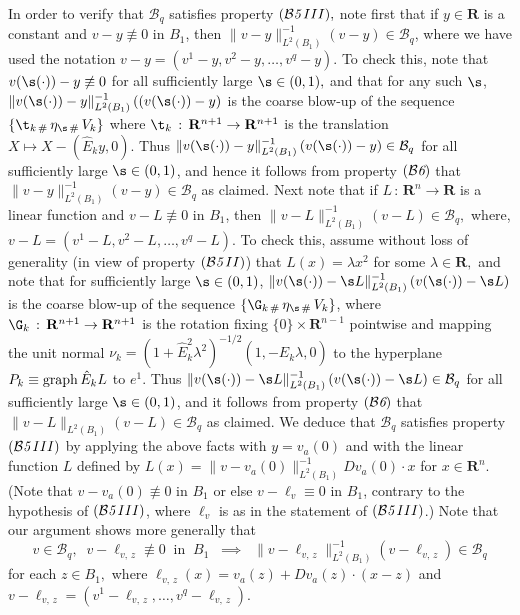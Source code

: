 \documentclass[a4paper,11pt]{amsart}
\begin{document}
In order to verify that ${\mathcal B}_{q}$ satisfies property $({\mathcal B{\emph 5 \, III}}),$ note first that if $y \in {\mathbf R}$ is a constant and $v - y \not\equiv 0$ in $B_{1}$, then $\|v - y\|_{L^{2}(B_{1})}^{-1}(v-y)\in {\mathcal B}_{q}$,  where we have used the notation $v - y = (v^{1} - y, v^{2} - y, \ldots, v^{q} - y).$ To check this, note that $v(\s(\cdot)) - y \not\equiv 0$ for 
all sufficiently large $\s \in (0, 1),$ and  that for any such $\s$, $\|v(\s(\cdot)) - y\|_{L^{2}(B_{1})}^{-1}\left((v(\s(\cdot)) - y\right)$ is the coarse blow-up of the sequence $\{\t_{k \, \#} \, \eta_{\s \, \#} \, V_{k}\}$ where $\t_{k} \, : \, {\mathbf R}^{n+1} \to {\mathbf R}^{n+1}$ is the translation $X \mapsto X - ({\hat E}_{k}y, 0).$ Thus $\|v(\s(\cdot)) - y\|_{L^{2}(B_{1})}^{-1}\left(v(\s(\cdot)) - y\right)\in {\mathcal B}_{q}$ for all sufficiently large $\s \in (0, 1)$, and hence it follows from property $({\mathcal B{\emph 6}})$ that $\|v - y\|_{L^{2}(B_{1})}^{-1}(v-y) \in {\mathcal B}_{q}$ as claimed. Next note that if $L \, : \, {\mathbf R}^{n} \to {\mathbf R}$ is a linear function and 
$v - L \not\equiv 0$ in $B_{1}$, then $\|v - L\|_{L^{2}(B_{1})}^{-1}(v-L) \in {\mathcal B}_{q},$ where, $v - L = (v^{1} - L, v^{2} - L, \ldots, v^{q} - L).$ To check this, assume without loss of generality (in view of property $({\mathcal B{\emph 5 \, II}})$) that $L(x) = \lambda x^{2}$ for some $\lambda \in {\mathbf R},$ and note that for sufficiently large $\s \in (0, 1)$, 
$\|v(\s(\cdot)) - \s L\|_{L^{2}(B_{1})}^{-1}\left(v(\s(\cdot)) - \s L\right)$ is the coarse blow-up of the sequence 
$\{\G_{k \, \#} \, \eta_{\s \, \#} \, V_{k}\}$, where $\G_{k}  \, : \, {\mathbf R}^{n+1} \to {\mathbf R}^{n+1}$ is the rotation 
fixing $\{0\} \times {\mathbf R}^{n-1}$ pointwise and mapping the unit normal $\nu_{k} = \left(1 + {\hat E}_{k}^{2}\lambda^{2}\right)^{-1/2}\left(1, -{\hat E}_{k}\lambda, 0\right)$ to the hyperplane $P_{k} \equiv {\rm graph} \, {\hat E}_{k}L$ to $e^{1}.$  Thus $\|v(\s(\cdot)) - \s L\|_{L^{2}(B_{1})}^{-1}\left(v(\s(\cdot)) - \s L\right) \in {\mathcal B}_{q}$  for all sufficiently large $\s \in (0, 1)$, and it follows from property $({\mathcal B{\emph 6}})$ that $\|v - L\|_{L^{2}(B_{1})}(v - L) \in {\mathcal B}_{q}$ as claimed. We deduce that ${\mathcal B}_{q}$ satisfies property $({\mathcal B{\emph 5 \, III}})$ by applying the above facts with $y = v_{a}(0)$ and with the linear function $L$ defined by 
$L(x) = \|v - v_{a}(0)\|_{L^{2}(B_{1})}^{-1}Dv_{a}(0) \cdot x$ for $x \in {\mathbf R}^{n}.$ (Note that $v  - v_{a}(0) \not\equiv 0$ in $B_{1}$ or else  $v - \ell_{v} \equiv 0$ in $B_{1}$, contrary to the hypothesis of $({\mathcal B{\emph 5 \, III}})$, where $\ell_{v}$ is as in the statement of $({\mathcal B{\emph 5 \, III}})$.) Note that our argument shows more generally that 
\begin{equation}\label{step2-4-1-0}
v \in {\mathcal B}_{q}, \;\; v - \ell_{v, \, z} \not\equiv 0 \;\; \mbox{in} \;\;B_{1} \;\; \implies \;\; \|v  - \ell_{v, \, z}\|_{L^{2}(B_{1})}^{-1}\left(v - \ell_{v, \, z}\right) \in {\mathcal B}_{q}
\end{equation}
for each $z \in B_{1},$ where $\ell_{v, \, z}(x) = v_{a}(z) + Dv_{a}(z) \cdot (x - z)$ and $v - \ell_{v, \, z} = (v^{1} - \ell_{v, \, z}, \ldots, v^{q} - \ell_{v, \, z}).$
 
\end{document}
